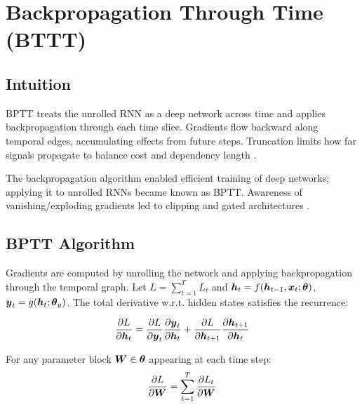 
\section{Backpropagation Through Time (BTTT)}
\label{sec:bptt}

\subsection*{Intuition}

BPTT treats the unrolled RNN as a deep network across time and applies backpropagation through each time slice. Gradients flow backward along temporal edges, accumulating effects from future steps. Truncation limits how far signals propagate to balance cost and dependency length \cite{GoodfellowEtAl2016}.

\begin{remark}
The backpropagation algorithm \cite{Rumelhart1986} enabled efficient training of deep networks; applying it to unrolled RNNs became known as BPTT. Awareness of vanishing/exploding gradients led to clipping and gated architectures \cite{GoodfellowEtAl2016,Hochreiter1997}.
\end{remark}


\subsection{BPTT Algorithm}

Gradients are computed by unrolling the network and applying backpropagation through the temporal graph. Let $L=\sum_{t=1}^{T} L_t$ and $\boldsymbol{h}_t = f(\boldsymbol{h}_{t-1}, \boldsymbol{x}_t; \boldsymbol{\theta})$, $\boldsymbol{y}_t = g(\boldsymbol{h}_t; \boldsymbol{\theta}_y)$. The total derivative w.r.t. hidden states satisfies the recurrence:

\begin{equation}
\frac{\partial L}{\partial \boldsymbol{h}_t} = \frac{\partial L}{\partial \boldsymbol{y}_t} \frac{\partial \boldsymbol{y}_t}{\partial \boldsymbol{h}_t} + \frac{\partial L}{\partial \boldsymbol{h}_{t+1}} \frac{\partial \boldsymbol{h}_{t+1}}{\partial \boldsymbol{h}_t}
\end{equation}

For any parameter block $\boldsymbol{W} \in \boldsymbol{\theta}$ appearing at each time step:
\begin{equation}
\frac{\partial L}{\partial \boldsymbol{W}} = \sum_{t=1}^{T} \frac{\partial L_t}{\partial \boldsymbol{W}}
\end{equation}

